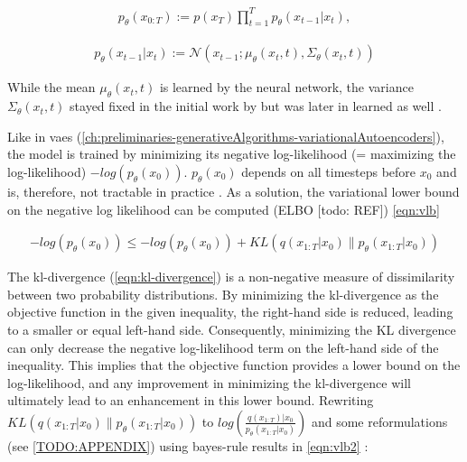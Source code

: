 \begin{equation}
  \label{eqn:reverse_1}
  \begin{align*}
    p_{\theta}(x_{0:T}) := p(x_T) \prod_{t=1}^T p_{\theta}(x_{t-1} | x_t),
  \end{align*}
\end{equation}

\begin{equation}
  \label{eqn:reverse_2}
  \begin{align*}
    p_{\theta}(x_{t-1}|x_t) := \mathcal{N}(x_{t-1}; \mu_{\theta}(x_t, t), \Sigma_{\theta}(x_t, t))
  \end{align*}
\end{equation}
    
While the mean $\mu_{\theta}(x_t, t)$ is learned by the neural network, the variance $\Sigma_{\theta}(x_t, t)$ stayed fixed in the initial work by \cite{ho2020DenoisingDiffusionProbabilistic} 
but was later in \cite{nichol2021ImprovedDenoisingDiffusion} learned as well \cite{zbinden2022ImplementingExperimentingDiffusion}.

Like in \glspl{vae} (\autoref{ch:preliminaries-generativeAlgorithms-variationalAutoencoders}), the model is trained by minimizing its negative log-likelihood (= maximizing the log-likelihood) $-log(p_\theta(x_0))$.
$p_\theta(x_0)$ depends on all timesteps before $x_0$ and is, therefore, not tractable in practice \cite{zbinden2022ImplementingExperimentingDiffusion}.
As a solution, the variational lower bound on the negative log likelihood can be computed (ELBO [todo: REF]) \autoref{eqn:vlb}

\begin{equation}
  \label{eqn:vlb}
  \begin{align*}
    -log(p_\theta(x_0)) \leq -log(p_\theta(x_0)) + KL(q(x_{1:T}|x_0) \parallel p_\theta(x_{1:T}|x_0))
  \end{align*}
\end{equation}

The \gls{kl}-divergence (\autoref{eqn:kl-divergence}) is a non-negative measure of dissimilarity between two probability distributions. 
By minimizing the \gls{kl}-divergence as the objective function in the given inequality, the right-hand side is reduced, leading to a smaller or equal left-hand side. 
Consequently, minimizing the KL divergence can only decrease the negative log-likelihood term on the left-hand side of the inequality. 
This implies that the objective function provides a lower bound on the log-likelihood, and any improvement in minimizing the \gls{kl}-divergence will ultimately lead to an enhancement in this lower bound.
Rewriting $KL(q(x_{1:T}|x_0) \parallel p_\theta(x_{1:T}|x_0))$ to $log(\frac{q(x_{1:T})|x_0}{p_\theta(x_{1:T}|x_0)})$ and some reformulations (see \autoref{TODO:APPENDIX}) using bayes-rule results in \autoref{eqn:vlb2} \cite{ho2020DenoisingDiffusionProbabilistic}:

